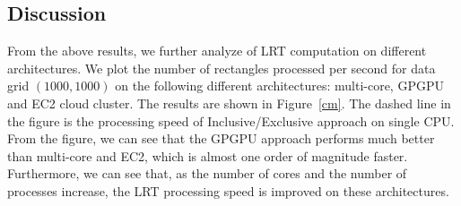 \documentclass[AMA,LATO1COL]{WileyNJD-v2-bak}
\begin{document}
\subsection{Discussion}
From the above results, we further analyze of LRT computation on different architectures. We plot the number of rectangles processed per second for data grid $(1000,1000)$ on the following different architectures: multi-core, GPGPU and EC2 cloud cluster. The results are shown in Figure~\ref{cm}. The dashed line in the figure is the processing speed of Inclusive/Exclusive approach on single CPU. From the figure, we can see that the GPGPU approach performs much better than multi-core and EC2, which is almost one order of magnitude faster. Furthermore, we can see that, as the number of cores and the number of processes increase, the LRT processing speed is improved on these architectures. \\
\end{document}
